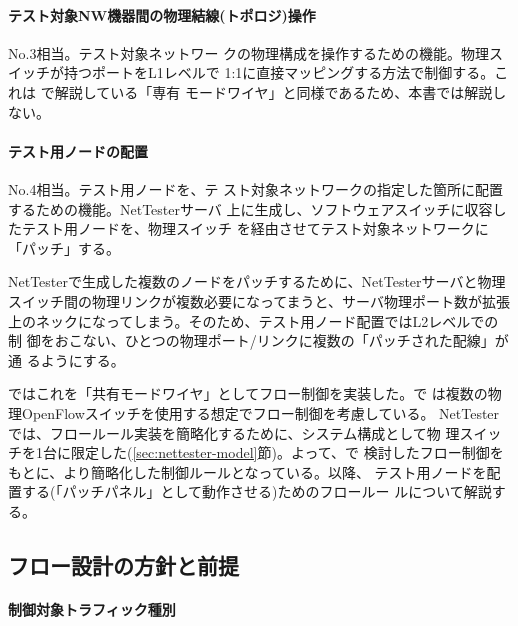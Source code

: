     \paragraph{テスト対象NW機器間の物理結線(トポロジ)操作}

 No.3相当。テスト対象ネットワー
クの物理構成を操作するための機能。物理スイッチが持つポートをL1レベルで
1:1に直接マッピングする方法で制御する。これは \lopj で解説している「専有
モードワイヤ」と同様であるため、本書では解説しない。

    \paragraph{テスト用ノードの配置}

 No.4相当。テスト用ノードを、テ
スト対象ネットワークの指定した箇所に配置するための機能。NetTesterサーバ
上に生成し、ソフトウェアスイッチに収容したテスト用ノードを、物理スイッチ
を経由させてテスト対象ネットワークに「パッチ」する。

NetTesterで生成した複数のノードをパッチするために、NetTesterサーバと物理
スイッチ間の物理リンクが複数必要になってまうと、サーバ物理ポート数が拡張
上のネックになってしまう。そのため、テスト用ノード配置ではL2レベルでの制
御をおこない、ひとつの物理ポート/リンクに複数の「パッチされた配線」が通
るようにする。

\lopj ではこれを「共有モードワイヤ」としてフロー制御を実装した。\lopj で
は複数の物理OpenFlowスイッチを使用する想定でフロー制御を考慮している。
NetTesterでは、フロールール実装を簡略化するために、システム構成として物
理スイッチを1台に限定した(\ref{sec:nettester-model}節)。よって、\lopj で
検討したフロー制御をもとに、より簡略化した制御ルールとなっている。以降、
テスト用ノードを配置する(「パッチパネル」として動作させる)ためのフロールー
ルについて解説する。

  \subsection{フロー設計の方針と前提}
  \label{sec:flow-design-premise}

    \paragraph{制御対象トラフィック種別}

